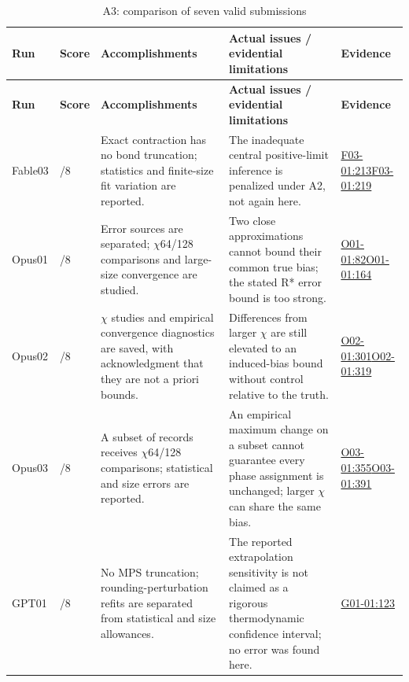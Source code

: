 \documentclass[11pt,a4paper]{article}
\begin{document}
{\fontsize{9.0}{12.6}\selectfont
\setlength{\tabcolsep}{2.5pt}
\begin{longtable}{>{\raggedright\arraybackslash}p{}>{\raggedright\arraybackslash}p{}>{\raggedright\arraybackslash}p{}>{\raggedright\arraybackslash}p{}>{\raggedright\arraybackslash}p{}}
\caption{A3: comparison of seven valid submissions}\\
\toprule
\textbf{Run} & \textbf{Score} & \textbf{Accomplishments} & \textbf{Actual issues /\allowbreak{} evidential limitations} & \textbf{Evidence}\tabularnewline
\midrule
\endfirsthead
\toprule
\textbf{Run} & \textbf{Score} & \textbf{Accomplishments} & \textbf{Actual issues /\allowbreak{} evidential limitations} & \textbf{Evidence}\tabularnewline
\midrule
\endhead
{}Fable03 & 8/\allowbreak{}8 & Exact contraction has no bond truncation; statistics and finite-size fit variation are reported. & The inadequate central positive-limit inference is penalized under A2,\allowbreak{} not again here. & \hyperref[src:F03-01]{F03-01:213}\newline \hyperref[src:F03-01]{F03-01:219}\tabularnewline
{}Opus01 & 3/\allowbreak{}8 & Error sources are separated; \ensuremath{\chi}64/\allowbreak{}128 comparisons and large-size convergence are studied. & Two close approximations cannot bound their common true bias; the stated R* error bound is too strong. & \hyperref[src:O01-01]{O01-01:82}\newline \hyperref[src:O01-01]{O01-01:164}\tabularnewline
{}Opus02 & 3/\allowbreak{}8 & \ensuremath{\chi} studies and empirical convergence diagnostics are saved,\allowbreak{} with acknowledgment that they are not a priori bounds. & Differences from larger \ensuremath{\chi} are still elevated to an induced-bias bound without control relative to the truth. & \hyperref[src:O02-01]{O02-01:301}\newline \hyperref[src:O02-01]{O02-01:319}\tabularnewline
{}Opus03 & 3/\allowbreak{}8 & A subset of records receives \ensuremath{\chi}64/\allowbreak{}128 comparisons; statistical and size errors are reported. & An empirical maximum change on a subset cannot guarantee every phase assignment is unchanged; larger \ensuremath{\chi} can share the same bias. & \hyperref[src:O03-01]{O03-01:355}\newline \hyperref[src:O03-01]{O03-01:391}\tabularnewline
{}GPT01 & 8/\allowbreak{}8 & No MPS truncation; rounding-perturbation refits are separated from statistical and size allowances. & The reported extrapolation sensitivity is not claimed as a rigorous thermodynamic confidence interval; no error was found here. & \hyperref[src:G01-01]{G01-01:123}\tabularnewline

\end{longtable}}
\end{document}
